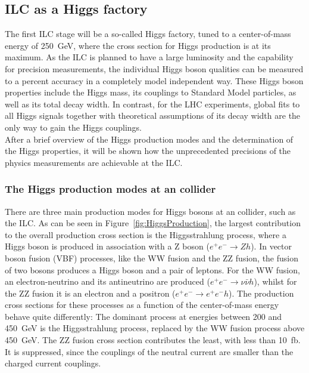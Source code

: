 \subsection{ILC as a Higgs factory}
The first ILC stage will be a so-called Higgs factory, tuned to a center-of-mass energy of \SI{250}{\GeV}, where the cross section for Higgs production is at its maximum.
As the ILC is planned to have a large luminosity and the capability for precision measurements, the individual Higgs boson qualities can be measured to a percent accuracy in a completely model independent way.
These Higgs boson properties include the Higgs mass, its couplings to Standard Model particles, as well as its total decay width.
In contrast, for the LHC experiments, global fits to all Higgs signals together with theoretical assumptions of its decay width are the only way to gain the Higgs couplings.
\\After a brief overview of the Higgs production modes and the determination of the Higgs properties, it will be shown how the unprecedented precisions of the physics measurements are achievable at the ILC.

\subsubsection{\texorpdfstring{The Higgs production modes at an \positron\electron collider}{The Higgs production modes at an electron positron collider}}
There are three main production modes for Higgs bosons at an \positron\electron collider, such as the ILC.
As can be seen in Figure~\ref{fig:HiggsProduction}, the largest contribution to the overall production cross section is the Higgsstrahlung process, where a Higgs boson is produced in association with a Z boson ($e^+e^-\rightarrow Zh$).
In vector boson fusion (VBF) processes, like the WW fusion and the ZZ fusion, the fusion of two bosons produces a Higgs boson and a pair of leptons.
For the WW fusion, an electron-neutrino and its antineutrino are produced ($e^+e^-\rightarrow \nu\bar{\nu} h$), whilst for the ZZ fusion it is an electron and a positron ($e^+e^-\rightarrow e^+e^-h$).
The production cross sections for these processes as a function of the center-of-mass energy behave quite differently:
The dominant process at energies between 200 and \SI{450}{\GeV} is the Higgsstrahlung process, replaced by the WW fusion process above \SI{450}{\GeV}.
The ZZ fusion cross section contributes the least, with less than \SI{10}{fb}.
It is suppressed, since the couplings of the neutral current are smaller than the charged current couplings.

